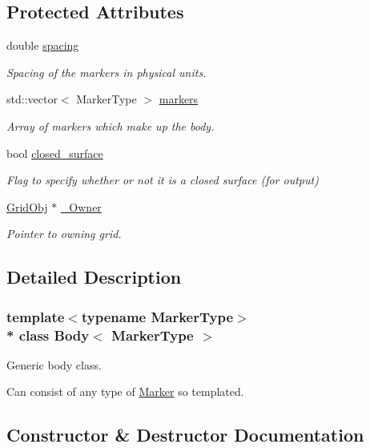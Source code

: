 \subsection*{Protected Attributes}
\begin{DoxyCompactItemize}
\item 
double \hyperlink{class_body_a1d4ac2e6fdbc946d5eab0973fd78770b}{spacing}
\begin{DoxyCompactList}\small\item\em Spacing of the markers in physical units. \end{DoxyCompactList}\item 
std\+::vector$<$ Marker\+Type $>$ \hyperlink{class_body_a4e0ac821f2331ec67793a44e36c855e3}{markers}
\begin{DoxyCompactList}\small\item\em Array of markers which make up the body. \end{DoxyCompactList}\item 
bool \hyperlink{class_body_a2701bdb00789d26ed72d6138d2e21bcb}{closed\+\_\+surface}
\begin{DoxyCompactList}\small\item\em Flag to specify whether or not it is a closed surface (for output) \end{DoxyCompactList}\item 
\hyperlink{class_grid_obj}{Grid\+Obj} $\ast$ \hyperlink{class_body_a5197f31e50222c32adefb795a93d7156}{\+\_\+\+Owner}
\begin{DoxyCompactList}\small\item\em Pointer to owning grid. \end{DoxyCompactList}\end{DoxyCompactItemize}


\subsection{Detailed Description}
\subsubsection*{template$<$typename Marker\+Type$>$\\*
class Body$<$ Marker\+Type $>$}

Generic body class. 

Can consist of any type of \hyperlink{class_marker}{Marker} so templated. 

\subsection{Constructor \& Destructor Documentation}
